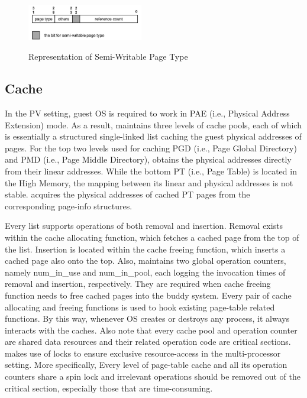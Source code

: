 \begin{figure}[ht]
\centering
\includegraphics[width=0.45\textwidth]{image/implementation/field-of-semi-type.jpg} \\
\caption{Representation of Semi-Writable Page Type}
\label{fig:field-of-semi-type}
\end{figure}

\subsection{\name Cache}

In the PV setting, guest OS is required to work in PAE (i.e., Physical Address Extension) mode. As a result, \name maintains three levels of cache pools, each of which is essentially a structured single-linked list caching the guest physical addresses of pages. For the top two levels used for caching PGD (i.e., Page Global Directory) and PMD (i.e., Page Middle Directory), \name obtains the physical addresses directly from their linear addresses. While the bottom PT (i.e., Page Table) is located in the High Memory, the mapping between its linear and physical addresses is not stable. \name acquires the physical addresses of cached PT pages from the corresponding page-info structures.

Every list supports operations of both removal and insertion. Removal exists within the cache allocating function, which fetches a cached page from the top of the list. Insertion is located within the cache freeing function, which inserts a cached page also onto the top. Also, \name maintains two global operation counters, namely num\_in\_use and num\_in\_pool, each logging the invocation times of removal and insertion, respectively. They are required when cache freeing function needs to free cached pages into the buddy system. Every pair of cache allocating and freeing functions is used to hook existing page-table related functions. By this way, whenever OS creates or destroys any process, it always interacts with the caches. Also note that every cache pool and operation counter are shared data resources and their related operation code are critical sections. \name makes use of locks to ensure exclusive resource-access in the multi-processor setting. More specifically, Every level of page-table cache and all its operation counters share a spin lock and irrelevant operations should be removed out of the critical section, especially those that are time-consuming.

